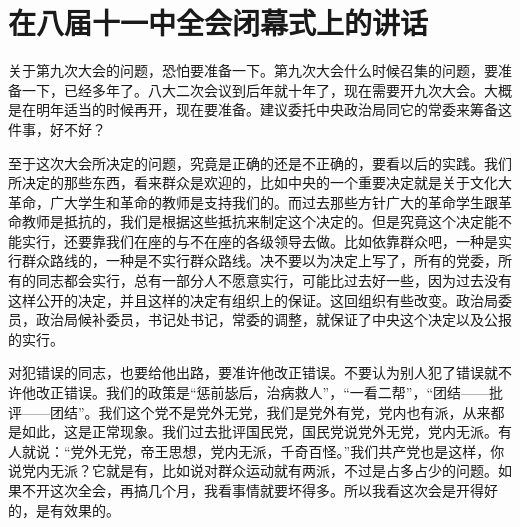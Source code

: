 \section[在八届十一中全会闭幕式上的讲话（一九六六年八月十二日）]{在八届十一中全会闭幕式上的讲话}


关于第九次大会的问题，恐怕要准备一下。第九次大会什么时候召集的问题，要准备一下，已经多年了。八大二次会议到后年就十年了，现在需要开九次大会。大概是在明年适当的时候再开，现在要准备。建议委托中央政治局同它的常委来筹备这件事，好不好？

至于这次大会所决定的问题，究竟是正确的还是不正确的，要看以后的实践。我们所决定的那些东西，看来群众是欢迎的，比如中央的一个重要决定就是关于文化大革命，广大学生和革命的教师是支持我们的。而过去那些方针广大的革命学生跟革命教师是抵抗的，我们是根据这些抵抗来制定这个决定的。但是究竟这个决定能不能实行，还要靠我们在座的与不在座的各级领导去做。比如依靠群众吧，一种是实行群众路线的，一种是不实行群众路线。决不要以为决定上写了，所有的党委，所有的同志都会实行，总有一部分人不愿意实行，可能比过去好一些，因为过去没有这样公开的决定，并且这样的决定有组织上的保证。这回组织有些改变。政治局委员，政治局候补委员，书记处书记，常委的调整，就保证了中央这个决定以及公报的实行。

对犯错误的同志，也要给他出路，要准许他改正错误。不要认为别人犯了错误就不许他改正错误。我们的政策是“惩前毖后，治病救人”，“一看二帮”，“团结——批评——团结”。我们这个党不是党外无党，我们是党外有党，党内也有派，从来都是如此，这是正常现象。我们过去批评国民党，国民党说党外无党，党内无派。有人就说：“党外无党，帝王思想，党内无派，千奇百怪。”我们共产党也是这样，你说党内无派？它就是有，比如说对群众运动就有两派，不过是占多占少的问题。如果不开这次全会，再搞几个月，我看事情就要坏得多。所以我看这次会是开得好的，是有效果的。

